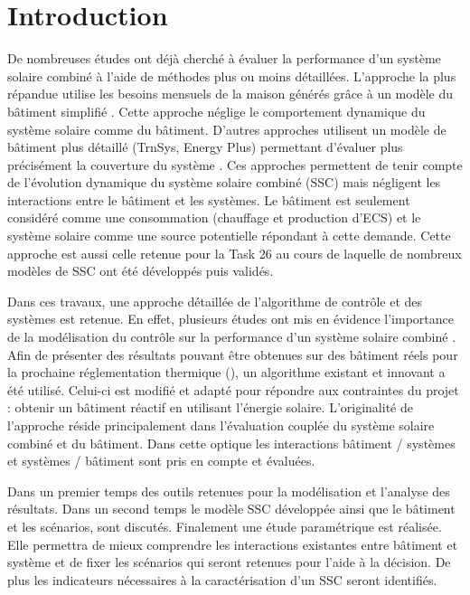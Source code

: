 


\section{Introduction} %
\label{sec:introduction}
De nombreuses études ont déjà cherché à évaluer la performance d’un système solaire
combiné à l’aide de méthodes plus ou moins détaillées. L’approche la plus répandue utilise
les besoins mensuels de la maison générés grâce à un modèle du bâtiment simplifié
\parencite{Raffenel2009657,Martinopoulos2014130}. Cette approche néglige le comportement dynamique du système
solaire comme du bâtiment. D’autres approches utilisent un modèle de bâtiment plus
détaillé (TrnSys, Energy Plus) permettant d’évaluer plus précisément la couverture du
système \parencite{Glembin2012601}. Ces approches permettent de tenir compte de l’évolution dynamique du système
solaire combiné (SSC) mais négligent les interactions entre le bâtiment et les systèmes. Le
bâtiment est seulement considéré comme une consommation (chauffage et production d’ECS) et
le système solaire comme une source potentielle répondant à cette demande. Cette approche
est aussi celle retenue pour la Task 26 \parencite{Task262003} au cours de laquelle de nombreux modèles
de SSC ont été développés puis validés.

Dans ces travaux, une approche détaillée de l’algorithme de contrôle et des systèmes est retenue. En
effet, plusieurs études ont mis en évidence l’importance de la modélisation du contrôle
sur la performance d’un système solaire combiné \parencite{Kicsiny20123489,Huang20123278}.
Afin de présenter des résultats pouvant être obtenues sur des bâtiment réels pour la
prochaine réglementation thermique (), un algorithme existant et innovant
a été utilisé. Celui-ci est modifié et adapté pour répondre aux contraintes du projet : obtenir
un bâtiment réactif en utilisant l’énergie solaire.
L’originalité de l’approche réside principalement dans l’évaluation couplée du système
solaire combiné et du bâtiment. Dans cette optique les interactions bâtiment / systèmes et
systèmes / bâtiment sont pris en compte et évaluées.

Dans un premier temps des outils retenues pour la modélisation et l’analyse des résultats.
Dans un second temps le modèle SSC développée ainsi que le bâtiment et les scénarios, sont
discutés. Finalement une étude paramétrique est réalisée. Elle permettra de mieux
comprendre les interactions existantes entre bâtiment et système et de fixer les scénarios
qui seront retenues pour l’aide à la décision. De plus les indicateurs nécessaires à la
caractérisation d’un SSC seront identifiés.


